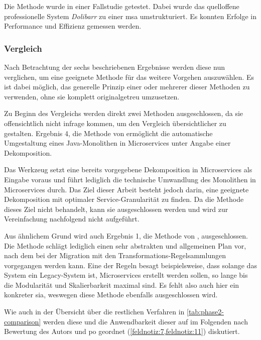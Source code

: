 Die Methode wurde in einer Fallstudie getestet.
Dabei wurde das quelloffene professionelle System \emph{Dolibarr} zu einer \gls{msa} umstrukturiert.
Es konnten Erfolge in Performance und Effizienz gemessen werden.

\subsubsection{Vergleich}

Nach Betrachtung der sechs beschriebenen Ergebnisse werden diese nun verglichen, um eine geeignete Methode für das weitere Vorgehen auszuwählen.
Es ist dabei möglich, das generelle Prinzip einer oder mehrerer dieser Methoden zu verwenden, ohne sie komplett originalgetreu umzusetzen.

Zu Beginn des Vergleichs werden direkt zwei Methoden ausgeschlossen, da sie offensichtlich nicht infrage kommen, um den Vergleich übersichtlicher zu gestalten. 
Ergebnis 4, die Methode von  ermöglicht die automatische Umgestaltung eines Java-Monolithen in Microservices unter Angabe einer Dekomposition.

Das Werkzeug setzt eine bereits vorgegebene Dekomposition in Microservices als Eingabe voraus und führt lediglich die technische Umwandlung des Monolithen in Microservices durch. 
Das Ziel dieser Arbeit besteht jedoch darin, eine geeignete Dekomposition mit optimaler Service-Granularität zu finden. 
Da die Methode dieses Ziel nicht behandelt, kann sie ausgeschlossen werden und wird zur Vereinfachung nachfolgend nicht aufgeführt.

Aus ähnlichem Grund wird auch Ergebnis 1, die Methode von , ausgeschlossen.
Die Methode schlägt lediglich einen sehr abstrakten und allgemeinen Plan vor, nach dem bei der Migration mit den Transformations-Regelsammlungen vorgegangen werden kann.
Eine der Regeln besagt beispielsweise, dass solange das System ein Legacy-System ist, Microservices erstellt werden sollen, so lange bis die Modularität und Skalierbarkeit maximal sind.
Es fehlt also auch hier ein konkreter \gls{sia}, weswegen diese Methode ebenfalls ausgeschlossen wird.

Wie auch in der Übersicht über die restlichen Verfahren in \cref{tab:phase2-comparison} werden diese und die Anwendbarkeit dieser auf \jf im Folgenden nach Bewertung des Autors und \gls{po} geordnet (\cref{feldnotiz:7,feldnotiz:11}) diskutiert.



